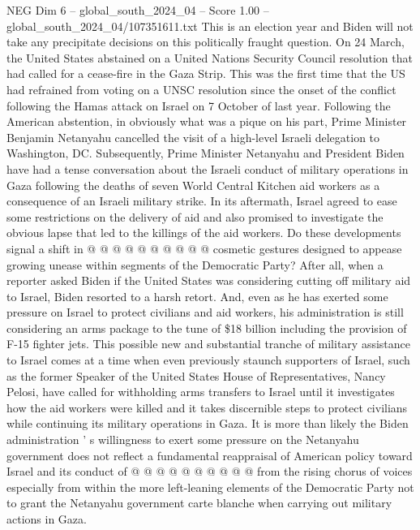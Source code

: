 \begin{textsample}{NEG Dim 6 – global\_south\_2024\_04 – Score 1.00 – global\_south\_2024\_04/107351611.txt}  \label{ex:f6_neg_359}
This is an election year and Biden will not take any precipitate decisions on this politically fraught question.
On 24 March, the United States abstained on a United Nations Security Council resolution that had called for a cease-fire in the Gaza Strip.
This was the first time that the US had refrained from voting on a UNSC resolution since the onset of the conflict following the Hamas attack on Israel on 7 October of last year.
Following the American abstention, in obviously what was a pique on his part, Prime Minister Benjamin Netanyahu cancelled the visit of a high-level Israeli delegation to Washington, DC.
Subsequently, Prime Minister Netanyahu and President Biden have had a tense conversation about the Israeli conduct of military operations in Gaza following the deaths of seven World Central Kitchen aid workers as a consequence of an Israeli military strike.
In its aftermath, Israel agreed to ease some restrictions on the delivery of aid and also promised to investigate the obvious lapse that led to the killings of the aid workers.
Do these developments signal a shift in @ @ @ @ @ @ @ @ @ @ cosmetic gestures designed to appease growing unease within segments of the Democratic Party?
After all, when a reporter asked Biden if the United States was considering cutting off military aid to Israel, Biden resorted to a harsh retort.
And, even as he has exerted some pressure on Israel to protect civilians and aid workers, his administration is still considering an arms package to the tune of \$18 billion including the provision of F-15 fighter jets.
This possible new and substantial tranche of military assistance to Israel comes at a time when even previously staunch supporters of Israel, such as the former Speaker of the United States House of Representatives, Nancy Pelosi, have called for withholding arms transfers to Israel until it investigates how the aid workers were killed and it takes discernible steps to protect civilians while continuing its military operations in Gaza.
It is more than likely the Biden administration ' s willingness to exert some pressure on the Netanyahu government does not reflect a fundamental reappraisal of American policy toward Israel and its conduct of @ @ @ @ @ @ @ @ @ @ from the rising chorus of voices especially from within the more left-leaning elements of the Democratic Party not to grant the Netanyahu government carte blanche when carrying out military actions in Gaza.

\end{textsample}

